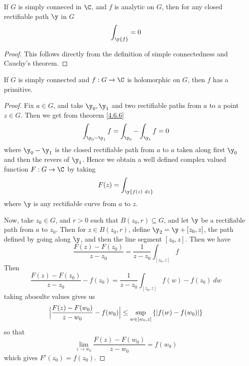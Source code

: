 \begin{theorem}\label{4.6.7}
    If $G$ is simply conneced in  $\C$, and  $f$ is analytic on $G$, then for
    any closed rectifiable path $\y$ in  $G$
    \begin{equation*}
        \int_\y{f}=0
    \end{equation*}
\end{theorem}
\begin{proof}
    This follows directly from the definition of simple connectedness and
    Cauchy's theorem.
\end{proof}
\begin{corollary}
    If $G$ is simply connected and  $f:G \xrightarrow{} \C$ is holomorphic on $G$,
    then  $f$ has a primitive.
\end{corollary}
\begin{proof}
    Fix $a \in G$, and take  $\y_0,\y_1$ and two rectifiable paths from $a$ to a
    point  $z \in G$. Then we get from theorem \ref{4.6.6}
    \begin{equation*}
        \int_{\y_0-\y_1}{f}=\int_{\y_0}-\int_{\y_1}{f}=0
    \end{equation*}
    where $\y_0-\y_1$ is the closed rectifiable path from $a$ to  $a$ taken
    along first $\y_0$ and then the revers of $\y_1$. Hence we obtain a well
    defined complex valued function $F:G \xrightarrow{} \C$ by taking
    \begin{equation*}
        F(z)=\int_\y{f(z) \ dz}
    \end{equation*}
    where $\y$ is any rectifiable curve from $a$ to $z$.

    Now, take  $z_0 \in G$, and $r>0$ such that $B(z_0,r) \subseteq G$, and let
    $\y$ be a rectifiable path from  $a$ to $z_0$. Then for $z \in B(z_0,r)$,
    define $\y_2=\y+[z_0,z]$, the path defined by going along $\y$, and then the
    line segment $[z_0,z]$. Then we have
    \begin{equation*}
        \frac{F(z)-F(z_0)}{z-z_0}=\frac{1}{z-z_0}\int_{[z_0,z]}{f}
    \end{equation*}
    Then
    \begin{equation*}
        \frac{F(z)-F(z_0)}{z-z_0}-f(z_0)=\frac{1}{z-z_0}\int_{[z_0,z]}{f(w)-f(z_0)
        \ dw}
    \end{equation*}
        taking abosulte values gives us
    \begin{equation*}
        \Big{|}\frac{F(z)-F(w_0)}{z-w_0}-f(w_0)\Big{|} \leq
        \sup_{w \in [w_0,z]}{\{|f(w)-f(w_0)|\}}
    \end{equation*}
    so that
    \begin{equation*}
        \lim_{z \xrightarrow{} w_0}{\frac{F(z)-F(w_0)}{z-w_0}}=f(w_0)
    \end{equation*}
    which gives $F'(z_0)=f(z_0)$.
\end{proof}

